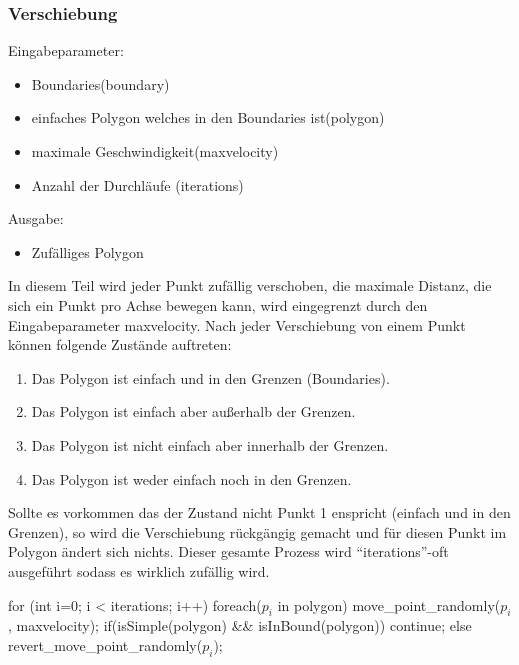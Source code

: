   \subsubsection{Verschiebung}
    Eingabeparameter: 
    \begin{itemize}
      \item Boundaries(boundary)
      \item einfaches Polygon welches in den Boundaries ist(polygon)
      \item maximale Geschwindigkeit(maxvelocity)
      \item Anzahl der Durchläufe (iterations)
    \end{itemize}
    Ausgabe:
    \begin{itemize}
      \item Zufälliges Polygon
    \end{itemize}
    In diesem Teil wird jeder Punkt zufällig verschoben, die maximale 
    Distanz, die sich ein Punkt pro Achse bewegen kann, wird eingegrenzt 
    durch den Eingabeparameter maxvelocity. Nach jeder Verschiebung von 
    einem Punkt können folgende Zustände auftreten:
    \begin{enumerate}
      \item Das Polygon ist einfach und in den Grenzen (Boundaries).
      \item Das Polygon ist einfach aber außerhalb der Grenzen.
      \item Das Polygon ist nicht einfach aber innerhalb der Grenzen.
      \item Das Polygon ist weder einfach noch in den Grenzen.
    \end{enumerate}
    Sollte es vorkommen das der Zustand nicht Punkt 1 enspricht (einfach 
    und in den Grenzen), so wird die Verschiebung rückgängig gemacht und 
    für diesen Punkt im Polygon ändert sich nichts.
    Dieser gesamte Prozess wird \enquote{iterations}-oft ausgeführt sodass 
    es wirklich zufällig wird.

\begin{code}[caption={Pseudocode},mathescape=true]
for (int i=0; i < iterations; i++)
{
  foreach($p_i$ in polygon)
  {
    move_point_randomly($p_i$, maxvelocity);
    if(isSimple(polygon) && isInBound(polygon))
      continue;
    else
      revert_move_point_randomly($p_i$);
  }
}
\end{code}

